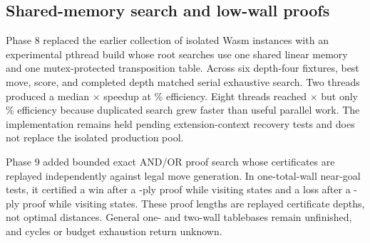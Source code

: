 

\subsection{Shared-memory search and low-wall proofs}
Phase 8 replaced the earlier collection of isolated Wasm instances with an
experimental pthread build whose root searches use one shared linear memory
and one mutex-protected transposition table. Across six depth-four fixtures,
best move, score, and completed depth matched serial exhaustive search. Two
threads produced a median \PhaseEightTwoSpeedup$\times$ speedup at
\PhaseEightTwoEfficiency\% efficiency. Eight threads reached
\PhaseEightEightSpeedup$\times$ but only \PhaseEightEightEfficiency\%
efficiency because duplicated search grew faster than useful parallel work.
The implementation remains held pending extension-context recovery tests and
does not replace the isolated production pool.

Phase 9 added bounded exact AND/OR proof search whose certificates are replayed
independently against legal move generation. In one-total-wall near-goal tests,
it certified a win after a \PhaseNineWinDepth-ply proof while visiting
\PhaseNineWinStates{} states and a loss after a \PhaseNineLossDepth-ply proof
while visiting \PhaseNineLossStates{} states. These proof lengths are replayed
certificate depths, not optimal distances. General one- and two-wall
tablebases remain unfinished, and cycles or budget exhaustion return unknown.
